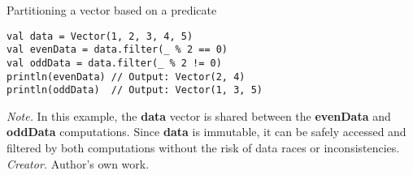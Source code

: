 \begin{table}[H]
\caption{Partitioning a vector based on a predicate}
\begin{lstlisting}
val data = Vector(1, 2, 3, 4, 5)
val evenData = data.filter(_ % 2 == 0)
val oddData = data.filter(_ % 2 != 0)
println(evenData) // Output: Vector(2, 4)
println(oddData)  // Output: Vector(1, 3, 5)
\end{lstlisting}
\small
\textit{Note.} In this example, the \textbf{data} vector is shared between the \textbf{evenData} and \textbf{oddData} computations. Since \textbf{data} is immutable, it can be safely accessed and filtered by both computations without the risk of data races or inconsistencies.
\textit{Creator.} Author's own work.
\end{table}